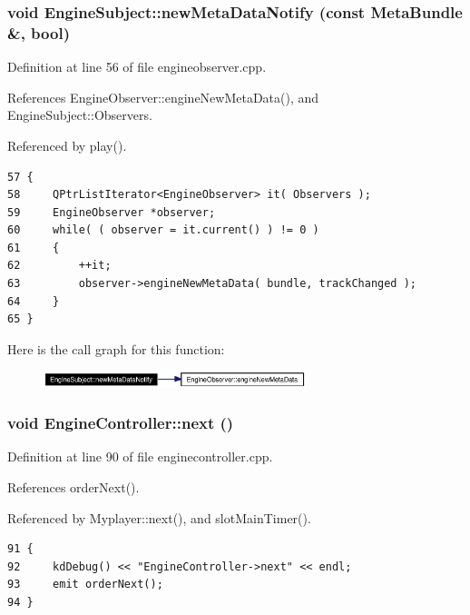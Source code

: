 \subsubsection{\setlength{\rightskip}{0pt plus 5cm}void Engine\-Subject::new\-Meta\-Data\-Notify (const {\bf Meta\-Bundle} \&, bool)\hspace{0.3cm}{\tt  [protected, inherited]}}\label{classEngineSubject_EngineSubjectb3}




Definition at line 56 of file engineobserver.cpp.

References Engine\-Observer::engine\-New\-Meta\-Data(), and Engine\-Subject::Observers.

Referenced by play().



\footnotesize\begin{verbatim}57 {
58     QPtrListIterator<EngineObserver> it( Observers );
59     EngineObserver *observer;
60     while( ( observer = it.current() ) != 0 )
61     {
62         ++it;
63         observer->engineNewMetaData( bundle, trackChanged );
64     }
65 }
\end{verbatim}\normalsize 


Here is the call graph for this function:\begin{figure}[H]
\begin{center}
\leavevmode
\includegraphics[width=217pt]{classEngineSubject_EngineSubjectb3_cgraph}
\end{center}
\end{figure}
\subsubsection{\setlength{\rightskip}{0pt plus 5cm}void Engine\-Controller::next ()\hspace{0.3cm}{\tt  [slot]}}\label{classEngineController_EngineControlleri1}




Definition at line 90 of file enginecontroller.cpp.

References order\-Next().

Referenced by Myplayer::next(), and slot\-Main\-Timer().



\footnotesize\begin{verbatim}91 {
92     kdDebug() << "EngineController->next" << endl;
93     emit orderNext();
94 }
\end{verbatim}\normalsize 
{}
